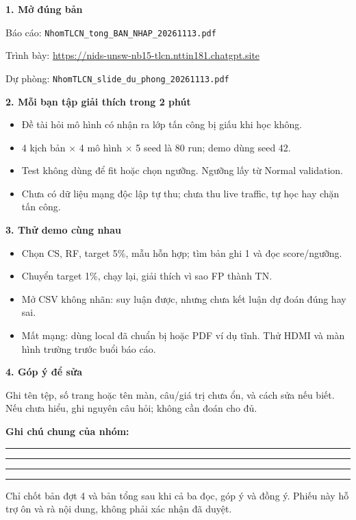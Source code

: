 \documentclass[11pt,a4paper]{article}
\begin{document}
\textbf{1. Mở đúng bản}\par
Báo cáo: \texttt{NhomTLCN\_tong\_BAN\_NHAP\_20261113.pdf}\par
Trình bày: \url{https://nids-unsw-nb15-tlcn.nttin181.chatgpt.site}\par
Dự phòng: \texttt{NhomTLCN\_slide\_du\_phong\_20261113.pdf}

\textbf{2. Mỗi bạn tập giải thích trong 2 phút}
\begin{itemize}
\item Đề tài hỏi mô hình có nhận ra lớp tấn công bị giấu khi học không.
\item 4 kịch bản × 4 mô hình × 5 seed là 80 run; demo dùng seed 42.
\item Test không dùng để fit hoặc chọn ngưỡng. Ngưỡng lấy từ Normal validation.
\item Chưa có dữ liệu mạng độc lập tự thu; chưa thu live traffic, tự học hay chặn tấn công.
\end{itemize}

\textbf{3. Thử demo cùng nhau}
\begin{itemize}
\item Chọn CS, RF, target 5\%, mẫu hỗn hợp; tìm bản ghi 1 và đọc score/ngưỡng.
\item Chuyển target 1\%, chạy lại, giải thích vì sao FP thành TN.
\item Mở CSV không nhãn: suy luận được, nhưng chưa kết luận dự đoán đúng hay sai.
\item Mất mạng: dùng local đã chuẩn bị hoặc PDF ví dụ tĩnh. Thử HDMI và màn hình trường trước buổi báo cáo.
\end{itemize}

\textbf{4. Góp ý để sửa}\par
Ghi tên tệp, số trang hoặc tên màn, câu/giá trị chưa ổn, và cách sửa nếu biết. Nếu chưa hiểu, ghi nguyên câu hỏi; không cần đoán cho đủ.

\textbf{Ghi chú chung của nhóm:}\par
\rule{\linewidth}{.3pt}\vspace{8mm}\par
\rule{\linewidth}{.3pt}\vspace{8mm}\par
\rule{\linewidth}{.3pt}\vspace{8mm}\par
\rule{\linewidth}{.3pt}

\vfill
{\small Chỉ chốt bản đợt 4 và bản tổng sau khi cả ba đọc, góp ý và đồng ý. Phiếu này hỗ trợ ôn và rà nội dung, không phải xác nhận đã duyệt.}
\end{document}
